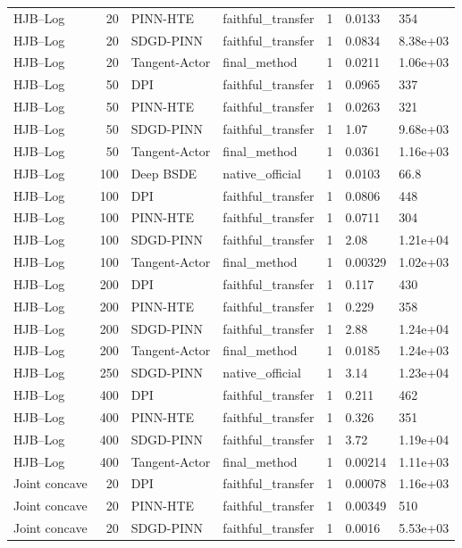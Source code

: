 \begin{tabular}{lrllrll}
HJB–Log & 20 & PINN-HTE & faithful\_transfer & 1 & 0.0133 & 354 \\
HJB–Log & 20 & SDGD-PINN & faithful\_transfer & 1 & 0.0834 & 8.38e+03 \\
HJB–Log & 20 & Tangent-Actor & final\_method & 1 & 0.0211 & 1.06e+03 \\
HJB–Log & 50 & DPI & faithful\_transfer & 1 & 0.0965 & 337 \\
HJB–Log & 50 & PINN-HTE & faithful\_transfer & 1 & 0.0263 & 321 \\
HJB–Log & 50 & SDGD-PINN & faithful\_transfer & 1 & 1.07 & 9.68e+03 \\
HJB–Log & 50 & Tangent-Actor & final\_method & 1 & 0.0361 & 1.16e+03 \\
HJB–Log & 100 & Deep BSDE & native\_official & 1 & 0.0103 & 66.8 \\
HJB–Log & 100 & DPI & faithful\_transfer & 1 & 0.0806 & 448 \\
HJB–Log & 100 & PINN-HTE & faithful\_transfer & 1 & 0.0711 & 304 \\
HJB–Log & 100 & SDGD-PINN & faithful\_transfer & 1 & 2.08 & 1.21e+04 \\
HJB–Log & 100 & Tangent-Actor & final\_method & 1 & 0.00329 & 1.02e+03 \\
HJB–Log & 200 & DPI & faithful\_transfer & 1 & 0.117 & 430 \\
HJB–Log & 200 & PINN-HTE & faithful\_transfer & 1 & 0.229 & 358 \\
HJB–Log & 200 & SDGD-PINN & faithful\_transfer & 1 & 2.88 & 1.24e+04 \\
HJB–Log & 200 & Tangent-Actor & final\_method & 1 & 0.0185 & 1.24e+03 \\
HJB–Log & 250 & SDGD-PINN & native\_official & 1 & 3.14 & 1.23e+04 \\
HJB–Log & 400 & DPI & faithful\_transfer & 1 & 0.211 & 462 \\
HJB–Log & 400 & PINN-HTE & faithful\_transfer & 1 & 0.326 & 351 \\
HJB–Log & 400 & SDGD-PINN & faithful\_transfer & 1 & 3.72 & 1.19e+04 \\
HJB–Log & 400 & Tangent-Actor & final\_method & 1 & 0.00214 & 1.11e+03 \\
Joint concave & 20 & DPI & faithful\_transfer & 1 & 0.00078 & 1.16e+03 \\
Joint concave & 20 & PINN-HTE & faithful\_transfer & 1 & 0.00349 & 510 \\
Joint concave & 20 & SDGD-PINN & faithful\_transfer & 1 & 0.0016 & 5.53e+03 \\

\end{tabular}
